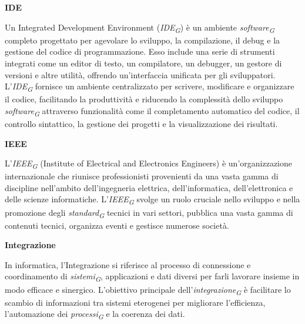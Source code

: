 \documentclass{article}
\begin{document}
\vspace{0.4cm}

\textbf{IDE}

\vspace{0.1cm}

Un Integrated Development Environment (\textit{IDE}\textsubscript{\textit{G}}) è un ambiente \textit{software}\textsubscript{\textit{G}} completo progettato per agevolare lo sviluppo, la compilazione, il debug e la gestione del codice di programmazione. Esso include una serie di strumenti integrati come un editor di testo, un compilatore, un debugger, un gestore di versioni e altre utilità, offrendo un'interfaccia unificata per gli sviluppatori. L'\textit{IDE}\textsubscript{\textit{G}} fornisce un ambiente centralizzato per scrivere, modificare e organizzare il codice, facilitando la produttività e riducendo la complessità dello sviluppo \textit{software}\textsubscript{\textit{G}} attraverso funzionalità come il completamento automatico del codice, il controllo sintattico, la gestione dei progetti e la visualizzazione dei risultati.

\vspace{0.4cm}

\textbf{IEEE}

\vspace{0.1cm}

L'\textit{IEEE}\textsubscript{\textit{G}} (Institute of Electrical and Electronics Engineers) è un'organizzazione internazionale che riunisce professionisti provenienti da una vasta gamma di discipline nell'ambito dell'ingegneria elettrica, dell'informatica, dell'elettronica e delle scienze informatiche. L'\textit{IEEE}\textsubscript{\textit{G}} svolge un ruolo cruciale nello sviluppo e nella promozione degli \textit{standard}\textsubscript{\textit{G}} tecnici in vari settori, pubblica una vasta gamma di contenuti tecnici, organizza eventi e gestisce numerose società.

\vspace{0.4cm}

\textbf{Integrazione}

\vspace{0.1cm}

In informatica, l'Integrazione si riferisce al processo di connessione e coordinamento di \textit{sistemi}\textsubscript{\textit{G}}, applicazioni e dati diversi per farli lavorare insieme in modo efficace e sinergico. L'obiettivo principale dell'\textit{integrazione}\textsubscript{\textit{G}} è facilitare lo scambio di informazioni tra sistemi eterogenei per migliorare l'efficienza, l'automazione dei \textit{processi}\textsubscript{\textit{G}} e la coerenza dei dati.
\end{document}
